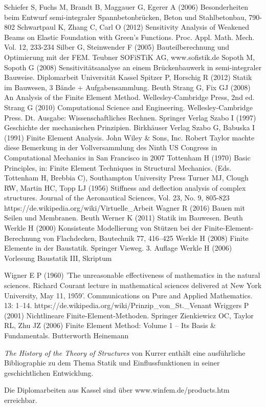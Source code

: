 \begin{thebibliography}{}
 Schiefer S, Fuchs M, Brandt B, Maggauer G, Egerer A (2006) \lqq Besonderheiten beim Entwurf semi-integraler Spannbetonbr\"{u}cken\rqq, Beton und Stahlbetonbau, 790-802
 Schwartpaul K, Zhang C, Carl O (2012) \lqq Sensitivity Analysis of Weakened Beams on Elastic Foundation with Green's Functions\rqq. Proc. Appl. Math. Mech. Vol. 12, 233-234
 Silber G, Steinwender F (2005) Bauteilberechnung und Optimierung mit der FEM. Teubner
  SOFiSTiK AG, www.sofistik.de
 Sopoth M, Sopoth G (2008) Sensitivit\"{a}tsanalyse an einem Br\"{u}ckenbauwerk in semi-integraler Bauweise. Diplomarbeit Universit\"{a}t Kassel
 Spitzer P, Horschig R (2012) Statik im Bauwesen, 3 B\"{a}nde + Aufgabensammlung. Beuth
 Strang G, Fix GJ (2008) An Analysis of the Finite Element Method.
Wellesley-Cambridge Press, 2nd ed.
 Strang G (2010)  Computational Science and Engineering. Wellesley-Cambridge Press. Dt. Ausgabe: Wissenschaftliches Rechnen. Springer Verlag
 Szabo I (1997) Geschichte der mechanischen Prinzipien. Birkh\"{a}user Verlag
 Szabo G, Babuska I (1991) Finite Element Analysis. John Wiley \& Sons, Inc.
 Robert Taylor machte diese Bemerkung in der Vollversammlung des
 Ninth US Congress in Computational Mechanics in San Francisco in 2007
 Tottenham H (1970) \lqq Basic Principles\rqq,
in: Finite Element Techniques in Structural Mechanics. (Eds. Tottenham H, Brebbia C), Southampton University Press
 Turner MJ, Clough RW, Martin HC, Topp LJ (1956) \lqq Stiffness and deflection analysis of complex structures\rqq. Journal of the Aeronautical Sciences, Vol. 23, No. 9, 805-823
 https://de.wikipedia.org/wiki/Virtuelle\_Arbeit
 Wagner R (2016) Bauen mit Seilen und Membranen. Beuth
 Werner K (2011) Statik im Bauwesen. Beuth
 Werkle H (2000) \lqq Konsistente Modellierung von St\"{u}tzen bei der Finite-Element-Berechnung von Flachdecken\rqq, Bautechnik 77, 416--425
 Werkle H (2008) Finite Elemente in der Baustatik. Springer Vieweg. 3. Auflage
 Werkle H (2006) Vorlesung Baustatik III, Skriptum

 Wigner E P (1960) 'The unreasonable effectiveness of mathematics in the natural sciences. Richard Courant lecture in mathematical sciences delivered at New York University, May 11, 1959'. Communications on Pure and Applied Mathematics. 13: 1--14.
 https://de.wikipedia.org/wiki/Prinzip\_von\_St.\_Venant
 Wriggers P (2001) Nichtlineare Finite-Element-Methoden. Springer
 Zienkiewicz OC, Taylor RL, Zhu JZ (2006) Finite Element Method: Volume 1 -- Its Basis \& Fundamentals. Butterworth Heinemann
\end{thebibliography}

{\em The History of the Theory of Structures\/} von Kurrer \cite{Kurrer} enth\"{a}lt eine ausf\"{u}hrliche Bibliographie zu dem Thema Statik und Einflussfunktionen in seiner geschichtlichen Entwicklung.

Die Diplomarbeiten aus Kassel sind \"{u}ber www.winfem.de/products.htm erreichbar. 